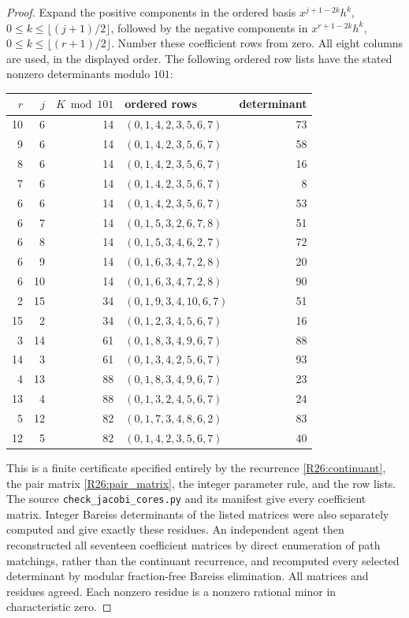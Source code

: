 \begin{proof}
Expand the positive components in the ordered basis
$x^{j+1-2k}h^k$, $0\leq k\leq\lfloor(j+1)/2\rfloor$, followed
by the negative components in $x^{r+1-2k}h^k$,
$0\leq k\leq\lfloor(r+1)/2\rfloor$. Number these coefficient
rows from zero. All eight columns are used, in the displayed
order. The following ordered row lists have the stated nonzero
determinants modulo $101$:
\begin{center}
\begin{tabular}{rrrlr}
$r$&$j$&$K\bmod101$&ordered rows&determinant\\ \hline
10&6&14&$(0,1,4,2,3,5,6,7)$&73\\
9&6&14&$(0,1,4,2,3,5,6,7)$&58\\
8&6&14&$(0,1,4,2,3,5,6,7)$&16\\
7&6&14&$(0,1,4,2,3,5,6,7)$&8\\
6&6&14&$(0,1,4,2,3,5,6,7)$&53\\
6&7&14&$(0,1,5,3,2,6,7,8)$&51\\
6&8&14&$(0,1,5,3,4,6,2,7)$&72\\
6&9&14&$(0,1,6,3,4,7,2,8)$&20\\
6&10&14&$(0,1,6,3,4,7,2,8)$&90\\
2&15&34&$(0,1,9,3,4,10,6,7)$&51\\
15&2&34&$(0,1,2,3,4,5,6,7)$&16\\
3&14&61&$(0,1,8,3,4,9,6,7)$&88\\
14&3&61&$(0,1,3,4,2,5,6,7)$&93\\
4&13&88&$(0,1,8,3,4,9,6,7)$&23\\
13&4&88&$(0,1,3,2,4,5,6,7)$&24\\
5&12&82&$(0,1,7,3,4,8,6,2)$&83\\
12&5&82&$(0,1,4,2,3,5,6,7)$&40
\end{tabular}
\end{center}
This is a finite certificate specified entirely by the recurrence
\eqref{R26:continuant}, the pair matrix
\eqref{R26:pair_matrix}, the integer parameter rule, and the
row lists. The source \texttt{check\_jacobi\_cores.py} and its
manifest give every coefficient matrix. Integer Bareiss
determinants of the listed matrices were also separately
computed and give exactly these residues. An independent agent
then reconstructed all seventeen coefficient matrices by direct
enumeration of path matchings, rather than the continuant recurrence,
and recomputed every selected determinant by modular fraction-free Bareiss
elimination. All matrices and residues agreed. Each nonzero residue
is a nonzero rational minor in characteristic zero.


\end{proof}
